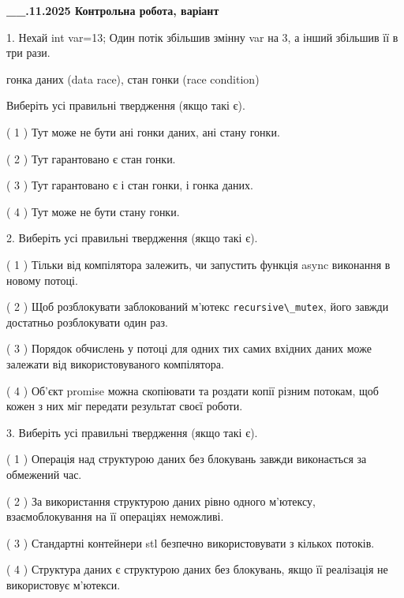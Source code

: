 \documentclass[12pt, ukrainian]{article}
\def\code#1{\Verb!#1!}
\begin{document}
\newpage
\begin {large}

\textbf{\_\_.11.2025 Контрольна робота, варіант  }\par


{
1. Нехай int var=13; Один потік збільшив змінну var на 3, а інший збільшив її в три рази.

гонка даних (data race), стан гонки (race condition)

Виберіть усі правильні твердження (якщо такі є).\par
\vspace{2mm}
( 1 ) Тут може не бути ані гонки даних, ані стану гонки.%

( 2 ) Тут гарантовано є стан гонки.%

( 3 ) Тут гарантовано є і стан гонки, і гонка даних.%

( 4 ) Тут може не бути стану гонки.%


2. Виберіть усі правильні твердження (якщо такі є).\par
\vspace{2mm}

( 1 ) Тільки від компілятора залежить, чи запустить функція async виконання в новому потоці.%

( 2 ) Щоб розблокувати заблокований м’ютекс \code{recursive\_mutex}, його завжди достатньо розблокувати один раз.%

( 3 ) Порядок обчислень у потоці для одних тих самих вхідних даних може залежати від використовуваного компілятора.%

( 4 ) Об’єкт promise можна скопіювати та роздати копії різним потокам, щоб кожен з них міг передати результат своєї роботи.%


3. Виберіть усі правильні твердження (якщо такі є).\par
\vspace{2mm}

( 1 ) Операція над структурою даних без блокувань завжди виконається за обмежений час.%

( 2 ) За використання структурою даних рівно одного м’ютексу, взаємоблокування на її операціях неможливі.%

( 3 ) Стандартні контейнери stl безпечно використовувати з кількох потоків.%

( 4 ) Структура даних є структурою даних без блокувань, якщо її реалізація не використовує м’ютекси.%


}
\end{large}
\end{document}
